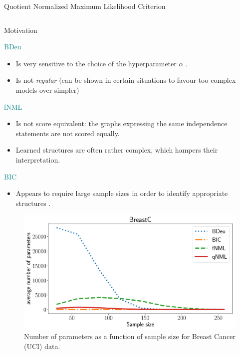 \documentclass[final]{beamer}
\newcommand{\heading}[1]{\alert{\large #1}\\}
\begin{document}
\begin{frame}{}
\begin{block}{Quotient Normalized Maximum Likelihood Criterion}
\begin{columns}[T]
	\begin{column}{0.34\textwidth} %
   		\heading{Motivation}
   		\begin{minipage}{0.49\textwidth}
   			\vspace*{12pt}
		   	\textcolor{teal}{BDeu}
			\begin{itemize}	    
		    \item Is very sensitive to the choice of the hyperparameter $\alpha$ \cite{cosco.uai07}.
		    \item Is not \textit{regular} \cite{Suzuki2017} (can be shown in certain situations to favour too complex models over simpler) 
		    \end{itemize}
		    \vspace*{12pt}
		    \textcolor{teal}{fNML}
			\begin{itemize}	    
		    \item Is not score equivalent: the graphs expressing the same independence statements are not scored equally.
		    \item Learned structures are often rather complex, which hampers their interpretation.
		    \end{itemize}		    
	
   		\end{minipage}
   		\begin{minipage}{0.49\textwidth}		   
		   \phantom{why vspace* does nothing??}
		   \textcolor{teal}{BIC}
		    \begin{itemize}
		    \item Appears to
		require large sample sizes in order to identify appropriate
		structures \cite{cosco.pgm08a,Liu2012}. 
			\end{itemize}  
			
			
			\begin{figure}
		  	\includegraphics[width=\textwidth]{breast_cancer_npmean.pdf}
		  	\caption{Number of parameters as a function of sample size for Breast Cancer (UCI) data.}
		  	\end{figure}
   		

\end{minipage}
\end{column}
\end{columns}
\end{block}
\end{frame}
\end{document}
